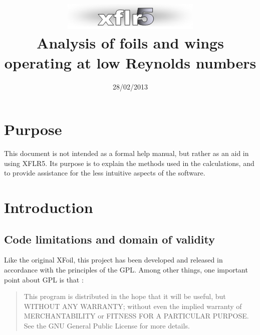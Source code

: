 \documentclass[a4paper,twoside,12pt,dvips]{article}
\begin{document}

\title{
\includegraphics[width=0.8\linewidth]{img-01}\\
Analysis of foils and wings\\
operating at low Reynolds numbers}
\author{}
\date{28/02/2013}

\maketitle

\clearpage


\tableofcontents

\clearpage


\section{Purpose}

This document is not intended as a formal help manual, but rather as
an aid in using XFLR5. Its purpose is to explain the methods used in
the calculations, and to provide assistance for the less intuitive
aspects of the software.


\section{Introduction}

\subsection{Code limitations and domain of validity}

Like the original XFoil, this project has been developed and released
in accordance with the principles of the GPL. Among other things, one
important point about GPL is that :

\begin{quotation}
This program is distributed in the hope that it will
be useful, but WITHOUT ANY WARRANTY; without even the implied warranty
of MERCHANTABILITY or FITNESS FOR A PARTICULAR PURPOSE. See the GNU
General Public License for more details.
\end{quotation}
\end{document}
